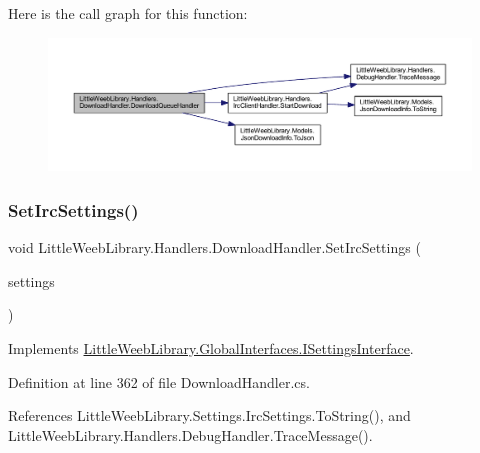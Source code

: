 Here is the call graph for this function\+:\nopagebreak
\begin{figure}[H]
\begin{center}
\leavevmode
\includegraphics[width=350pt]{class_little_weeb_library_1_1_handlers_1_1_download_handler_a2f646f8d28235a8953b67207ee6131d9_cgraph}
\end{center}
\end{figure}
\mbox{\label{class_little_weeb_library_1_1_handlers_1_1_download_handler_a6edcb9be7543c9fb587df06c994f50fb}} 
\subsubsection{\texorpdfstring{Set\+Irc\+Settings()}{SetIrcSettings()}}
{\footnotesize\ttfamily void Little\+Weeb\+Library.\+Handlers.\+Download\+Handler.\+Set\+Irc\+Settings (\begin{DoxyParamCaption}\item[{\mbox{\hyperlink{class_little_weeb_library_1_1_settings_1_1_irc_settings}{Irc\+Settings}}}]{settings }\end{DoxyParamCaption})}



Implements \mbox{\hyperlink{interface_little_weeb_library_1_1_global_interfaces_1_1_i_settings_interface_a9ddf06e247a96d757482b37ddb070e3d}{Little\+Weeb\+Library.\+Global\+Interfaces.\+I\+Settings\+Interface}}.



Definition at line 362 of file Download\+Handler.\+cs.



References Little\+Weeb\+Library.\+Settings.\+Irc\+Settings.\+To\+String(), and Little\+Weeb\+Library.\+Handlers.\+Debug\+Handler.\+Trace\+Message().


